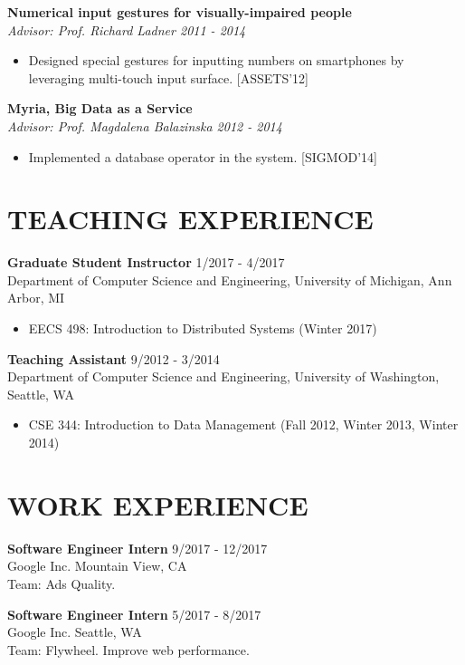 \documentclass[zhemargin]{res}
\begin{document}
\begin{resume}
	\textbf{Numerical input gestures for visually-impaired people}\\
    \textit{Advisor: Prof. Richard Ladner \hfill 2011 - 2014}
	\begin{itemize}
    \item Designed special gestures for inputting numbers on smartphones 
      by leveraging multi-touch input surface. [ASSETS'12]
	\end{itemize}

	\textbf{Myria, Big Data as a Service}\\
    \textit{Advisor: Prof. Magdalena Balazinska \hfill 2012 - 2014}
	\begin{itemize}
    \item Implemented a database operator in the system. [SIGMOD'14]
	\end{itemize}

\section{\small TEACHING EXPERIENCE}
	\textbf{Graduate Student Instructor} \hfill 1/2017 - 4/2017 \\
	Department of Computer Science and Engineering, University of Michigan, Ann Arbor, MI
	\begin{itemize}
      \item EECS 498: Introduction to Distributed Systems (Winter 2017)
	\end{itemize}
	\textbf{Teaching Assistant} \hfill 9/2012 - 3/2014 \\
	Department of Computer Science and Engineering, University of Washington, Seattle, WA
	\begin{itemize}
      \item CSE 344: Introduction to Data Management (Fall 2012, Winter 2013, Winter 2014)
	\end{itemize}

\section{\small WORK EXPERIENCE}
    \textbf{Software Engineer Intern} \hfill 9/2017 - 12/2017 \\
    Google Inc. Mountain View, CA\\
    Team: Ads Quality. 

    \textbf{Software Engineer Intern} \hfill 5/2017 - 8/2017 \\
    Google Inc. Seattle, WA\\
    Team: Flywheel. Improve web performance.


\end{resume}
\end{document}
